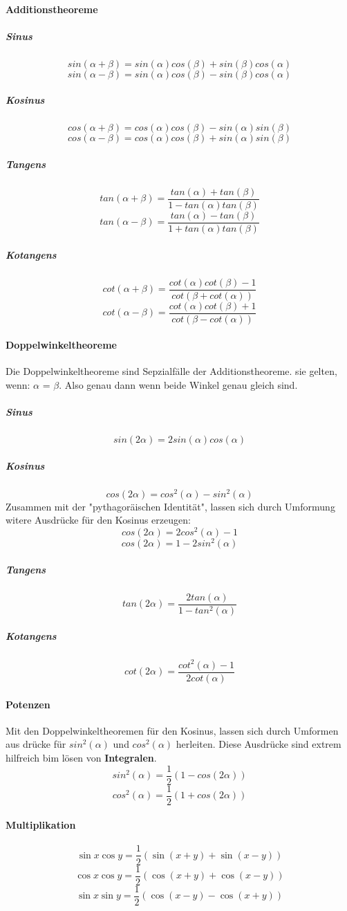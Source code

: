 \paragraph{Additionstheoreme}
\subparagraph{Sinus}
$$sin(\alpha + \beta) = sin(\alpha)cos(\beta)+sin(\beta)cos(\alpha)$$
$$sin(\alpha - \beta) = sin(\alpha)cos(\beta)-sin(\beta)cos(\alpha)$$
\subparagraph{Kosinus}
$$cos(\alpha + \beta) = cos(\alpha)cos(\beta)-sin(\alpha)sin(\beta)$$
$$cos(\alpha - \beta) = cos(\alpha)cos(\beta)+sin(\alpha)sin(\beta)$$
\subparagraph{Tangens}
$$tan(\alpha + \beta) = \frac{tan(\alpha)+tan(\beta)}{1-tan(\alpha)tan(\beta)}$$
$$tan(\alpha - \beta) = \frac{tan(\alpha)-tan(\beta)}{1+tan(\alpha)tan(\beta)}$$
\subparagraph{Kotangens}
$$cot(\alpha+\beta)=\frac{cot(\alpha)cot(\beta)-1}{cot(\beta+cot(\alpha))}$$
$$cot(\alpha-\beta)=\frac{cot(\alpha)cot(\beta)+1}{cot(\beta-cot(\alpha))}$$
\paragraph{Doppelwinkeltheoreme}
Die Doppelwinkeltheoreme sind Sepzialfälle der Additionstheoreme. sie gelten, wenn: $\alpha$ = $\beta$. Also genau dann wenn beide Winkel genau gleich sind.
\subparagraph{Sinus}
$$sin(2\alpha)=2sin(\alpha)cos(\alpha)$$
\subparagraph{Kosinus}
$$cos(2\alpha)=cos^2(\alpha)-sin^2(\alpha)$$
Zusammen mit der "pythagoräischen Identität", lassen sich durch Umformung witere Ausdrücke für den Kosinus erzeugen:
$$cos(2\alpha)=2cos^2(\alpha)-1$$
$$cos(2\alpha)=1-2sin^2(\alpha)$$
\subparagraph{Tangens}
$$tan(2\alpha)=\frac{2tan(\alpha)}{1-tan^2(\alpha)}$$
\subparagraph{Kotangens}
$$cot(2\alpha)=\frac{cot^2(\alpha)-1}{2cot(\alpha)}$$
\paragraph{Potenzen}
Mit den Doppelwinkeltheoremen für den Kosinus, lassen sich durch Umformen aus drücke für $sin^2(\alpha)$ und $cos^2(\alpha)$ herleiten. Diese Ausdrücke sind extrem hilfreich bim lösen von \textbf{Integralen}.
$$sin^2(\alpha)=\frac{1}{2}(1-cos(2\alpha))$$
$$cos^2(\alpha)=\frac{1}{2}(1+cos(2\alpha))$$
\paragraph{Multiplikation}
$$\sin x \cos y = \frac{1}{2} \left( \sin(x+y) + \sin(x-y) \right)$$
$$\cos x \cos y = \frac{1}{2} \left( \cos(x+y) + \cos(x-y) \right)$$
$$\sin x \sin y = \frac{1}{2} \left( \cos(x-y) - \cos(x+y) \right)$$
